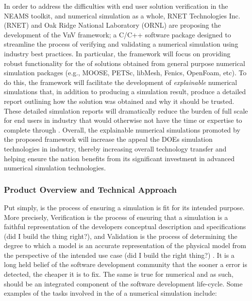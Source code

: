 In order to address the difficulties with end user solution verification in the NEAMS toolkit, and numerical simulation as a whole, RNET Technologies Inc. (RNET) and Oak Ridge National Laboratory (ORNL) are proposing the development of the VnV framework; a C/C++ software package designed to streamline the process of verifying and validating a numerical simulation using industry best practices. In particular, the framework will focus on providing 
robust functionality for the \VV of solutions obtained from general purpose numerical simulation packages (e.g., MOOSE, PETSc, libMesh, Fenics, OpenFoam, etc). To do this, the framework will facilitate the development of \emph{explainable} numerical simulations that, in addition to producing a simulation result, produce a detailed report outlining how the solution was obtained and why it should be trusted. These detailed simulation reports will dramatically reduce the burden of full scale \VV for end users in industry that would otherwise not have the time or expertise to complete through \VV. Overall, the explainable numerical simulations promoted by the proposed framework will increase the appeal the DOEs simulation technologies in industry, thereby increasing overall technology transfer and helping ensure the nation benefits from its significant investment in advanced numerical simulation technologies.


\subsubsection{Product Overview and Technical Approach}

Put simply, \VV is the process of ensuring a simulation is fit for its intended purpose. More precisely, Verification is the process of ensuring that a simulation is a faithful representation of the developers conceptual description and specifications (did I build the thing right?), and Validation is the process of determining the degree to which a model is an accurate representation of the physical model from the perspective of the intended use case (did I build the right thing?) \cite{DOD-VVA}. It is a long held belief of the software development community that the sooner a error is detected, the cheaper it is to fix. The same is true for numerical \MS and as such, \VV should be an integrated component of the software development life-cycle. Some examples of the tasks involved in the \VV of a numerical simulation include:

